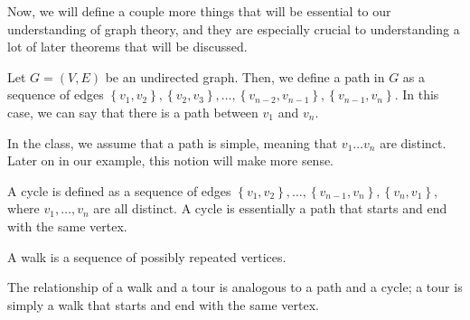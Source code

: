 \documentclass[openany]{book}
\begin{document}
Now, we will define a couple more things that will be essential to our understanding of graph theory, and they are especially crucial to understanding a lot of later theorems that will be discussed.
\begin{defn}[Path]
	Let $G=(V,E)$ be an undirected graph. Then, we define a path in $G$ as a sequence of edges $\left\{  v_{1}, v_{2} \right\}, \left\{  v_{2}, v_{3} \right\},\ldots, \left\{  v_{n-2}, v_{n-1}\right\}, \left\{  v_{n-1}, v_{n} \right\}$. In this case, we can say that there is a path between $v_{1}$ and $v_{n}$.
\end{defn}
\begin{rmk}
	In the class, we assume that a path is simple, meaning that $v_{1} \ldots v_{n}$ are distinct. Later on in our example, this notion will make more sense.
\end{rmk}
\begin{defn}[Cycle]
	A cycle is defined as a sequence of edges $\left\{  v_{1}, v_{2} \right\},\ldots, \left\{  v_{n-1}, v_{n} \right\}, \left\{  v_{n}, v_{1}\right\}$, where $v_{1}, \ldots, v_{n}$ are all distinct. A cycle is essentially a path that starts and end with the same vertex.
\end{defn}
\begin{defn}[Walk]
	A walk is a sequence of possibly repeated vertices.
\end{defn}
\begin{defn}[Tour]
	The relationship of a walk and a tour is analogous to a path and a cycle; a tour is simply a walk that starts and end with the same vertex.
\end{defn}
\end{document}
